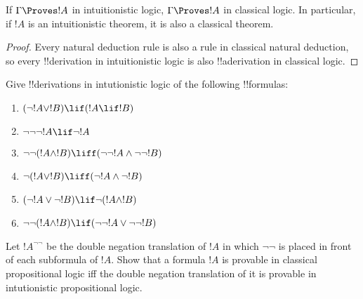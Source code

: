 \documentclass[../../../include/open-logic-section]{subfiles}
\begin{document}
\begin{prop}
  If $\Gamma \Proves !A$ in intuitionistic logic, $\Gamma \Proves !A$ in
  classical logic. In particular, if $!A$ is an intuitionistic
  theorem, it is also a classical theorem.
\end{prop}

\begin{proof}
  Every natural deduction rule is also a rule in classical natural
  deduction, so every !!{derivation} in intuitionistic logic is also
  !!a{derivation} in classical logic.
\end{proof}

\begin{prob}
  Give !!{derivation}s in intutionistic logic of the following !!{formulas}:
  \begin{enumerate}
    \item $(\lnot !A \lor !B) \lif (!A \lif !B)$
    \item $\lnot\lnot\lnot !A \lif \lnot !A$
    \item $\lnot\lnot (!A \land !B) \liff (\lnot\lnot !A\land \lnot \lnot !B)$
    \item $\lnot (!A \lor !B) \liff (\lnot !A \land \lnot !B)$
    \item $(\lnot !A \lor \lnot !B) \lif \lnot (!A \land !B)$
    \item $\lnot\lnot ( !A \land !B) \lif  (\lnot\lnot !A \lor
    \lnot\lnot !B)$
  \end{enumerate}
\end{prob}

\begin{prob}
Let $!A^{\lnot \lnot}$ be the double negation translation of $!A$ in which $\lnot\lnot$ is placed in front of each subformula of $!A$. Show that a formula $!A$ is provable in classical propositional logic iff the double negation translation of it is provable in intutionistic propositional logic.
\end{prob}
\end{document}
